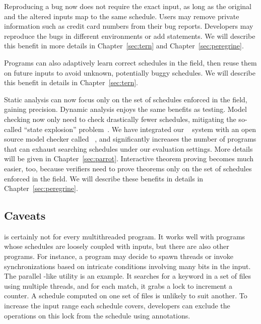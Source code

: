  Reproducing a bug now does not require the exact input,
as long as the original and the altered inputs map to the same schedule.
Users may remove private
information such as credit card numbers from their bug reports. Developers
may reproduce the bugs in different environments or add 
statements. We will describe this benefit in more details in
Chapter~\ref{sec:tern} and Chapter~\ref{sec:peregrine}.

  Programs can also adaptively learn correct
schedules in the field, then reuse them on future inputs to avoid unknown,
potentially buggy schedules.  We will describe this benefit in details in
Chapter~\ref{sec:tern}.

 Static analysis can now focus
only on the set of schedules enforced in the field, gaining
precision.  Dynamic analysis enjoys the same benefits as testing.  Model
checking now only need to check drastically fewer schedules, mitigating the
so-called ``state explosion'' problem~\cite{clarke:ModelChecking}. We have
integrated our \parrot~\cite{parrot:sosp13} system with an open source model
checker called \dbug~\cite{dbug:spin11}, and \parrot significantly increases the
number of programs that \dbug can exhaust searching schedules under our
evaluation settings. More details will be given in Chapter~\ref{sec:parrot}.
Interactive theorem proving becomes much easier, too, because verifiers
need to prove theorems only on the set of schedules enforced in the field.  We
will describe these benefits in details in Chapter~\ref{sec:peregrine}.


\subsection{Caveats}

\smt is certainly not for every multithreaded program.  It works well with
programs whose schedules are loosely coupled with inputs, but there are also
other programs.  For instance, a program may decide to spawn
threads or invoke synchronizations based on intricate conditions involving many
bits in the input. The parallel -like utility \pfscan is an example. 
It
searches for a keyword in a set of files using multiple threads, and for each
match, it grabs a lock to increment a counter.  A schedule computed on one set
of files is unlikely to suit another. To increase the input range each schedule
covers, developers can exclude the operations on this lock from the schedule
using annotations.



